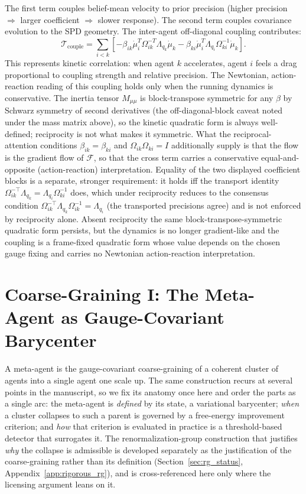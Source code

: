 \documentclass[11pt]{article}
\begin{document}
The first term couples belief-mean velocity to prior precision (higher precision $\Rightarrow$ larger coefficient $\Rightarrow$ slower response). The second term couples covariance evolution to the SPD geometry. The inter-agent off-diagonal coupling contributes:
\begin{equation}
\mathcal{T}_{\mathrm{couple}} = \sum_{i < k}\left[-\beta_{ik}\dot{\mu}_i^T \Omega_{ik}^{-T}\Lambda_{q_k}\dot{\mu}_k - \beta_{ki}\dot{\mu}_i^T \Lambda_{q_i}\Omega_{ki}^{-1} \dot{\mu}_k\right].
\end{equation}
This represents kinetic correlation: when agent $k$ accelerates, agent $i$ feels a drag proportional to coupling strength and relative precision. The Newtonian, action-reaction reading of this coupling holds only when the running dynamics is conservative. The inertia tensor $M_{\mu\mu}$ is block-transpose symmetric for any $\beta$ by Schwarz symmetry of second derivatives (the off-diagonal-block caveat noted under the mass matrix above), so the kinetic quadratic form is always well-defined; reciprocity is not what makes it symmetric. What the reciprocal-attention conditions $\beta_{ik} = \beta_{ki}$ and $\Omega_{ik}\Omega_{ki} = I$ additionally supply is that the flow is the gradient flow of $\mathcal{F}$, so that the cross term carries a conservative equal-and-opposite (action-reaction) interpretation. Equality of the two displayed coefficient blocks is a separate, stronger requirement: it holds iff the transport identity $\Omega_{ik}^{-\top}\Lambda_{q_k} = \Lambda_{q_i}\Omega_{ki}^{-1}$ does, which under reciprocity reduces to the consensus condition $\Omega_{ik}^{-\top}\Lambda_{q_k}\Omega_{ik}^{-1} = \Lambda_{q_i}$ (the transported precisions agree) and is not enforced by reciprocity alone. Absent reciprocity the same block-transpose-symmetric quadratic form persists, but the dynamics is no longer gradient-like and the coupling is a frame-fixed quadratic form whose value depends on the chosen gauge fixing and carries no Newtonian action-reaction interpretation.
\section{Coarse-Graining I: The Meta-Agent as Gauge-Covariant Barycenter}\label{sec:meta_agent_formation}

A meta-agent is the gauge-covariant coarse-graining of a coherent cluster of agents into a single agent one scale up. The same construction recurs at several points in the manuscript, so we fix its anatomy once here and order the parts as a single arc: the meta-agent is \emph{defined} by its state, a variational barycenter; \emph{when} a cluster collapses to such a parent is governed by a free-energy improvement criterion; and \emph{how} that criterion is evaluated in practice is a threshold-based detector that surrogates it. The renormalization-group construction that justifies \emph{why} the collapse is admissible is developed separately as the justification of the coarse-graining rather than its definition (Section~\ref{sec:rg_status}, Appendix~\ref{app:rigorous_rg}), and is cross-referenced here only where the licensing argument leans on it.
\end{document}
